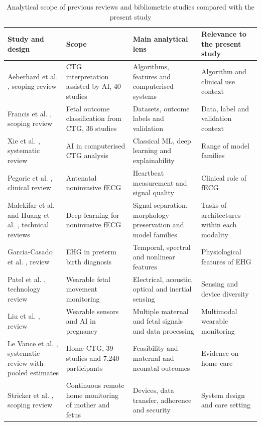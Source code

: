\begin{table}[!t]
\caption{Analytical scope of previous reviews and bibliometric studies compared with the present study}
\label{tab:lit}
\centering
\footnotesize
\begin{tabularx}{\textwidth}{@{}L{3.9cm}L{4.4cm}L{4.6cm}Y@{}}
\toprule
Study and design & Scope & Main analytical lens & Relevance to the present study \\
\midrule
Aeberhard et al. \cite{aeberhard2023}, scoping review & CTG interpretation assisted by AI, 40 studies & Algorithms, features and computerised systems & Algorithm and clinical use context \\
Francis et al. \cite{francis2024}, scoping review & Fetal outcome classification from CTG, 36 studies & Datasets, outcome labels and validation & Data, label and validation context \\
Xie et al. \cite{xie2024}, systematic review & AI in computerised CTG analysis & Classical ML, deep learning and explainability & Range of model families \\
Pegorie et al. \cite{pegorie2024}, clinical review & Antenatal noninvasive fECG & Heartbeat measurement and signal quality & Clinical role of fECG \\
Malekifar et al. \cite{malekifar2025} and Huang et al. \cite{huang2026}, technical reviews & Deep learning for noninvasive fECG & Signal separation, morphology preservation and model families & Tasks of architectures within each modality \\
Garcia-Casado et al. \cite{garcia2018}, review & EHG in preterm birth diagnosis & Temporal, spectral and nonlinear features & Physiological features of EHG \\
Patel et al. \cite{patel2025}, technology review & Wearable fetal movement monitoring & Electrical, acoustic, optical and inertial sensing & Sensing and device diversity \\
Liu et al. \cite{liu2024}, review & Wearable sensors and AI in pregnancy & Multiple maternal and fetal signals and data processing & Multimodal wearable monitoring \\
Le Vance et al. \cite{levance2026}, systematic review with pooled estimates & Home CTG, 39 studies and 7,240 participants & Feasibility and maternal and neonatal outcomes & Evidence on home care \\
Stricker et al. \cite{stricker2025}, scoping review & Continuous remote home monitoring of mother and fetus & Devices, data transfer, adherence and security & System design and care setting \\

\end{tabularx}
\end{table}
